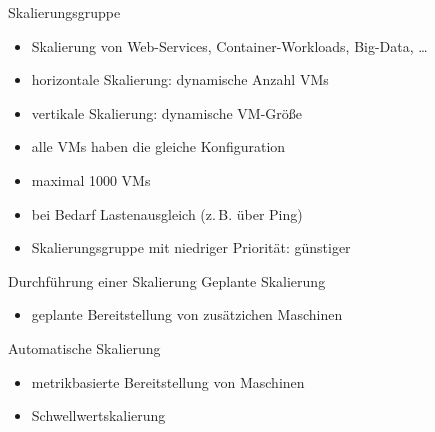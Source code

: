 

\begin{flashcard}[Definition]{Skalierungsgruppe}
    \begin{itemize}
        \item Skalierung von Web-Services, Container-Workloads, Big-Data, \ldots
        \item horizontale Skalierung: dynamische Anzahl VMs
        \item vertikale Skalierung: dynamische VM-Größe
        \item alle VMs haben die gleiche Konfiguration
        \item maximal 1000 VMs
        \item bei Bedarf Lastenausgleich (z.\,B. über Ping)
        \item Skalierungsgruppe mit niedriger Priorität: günstiger
    \end{itemize}
\end{flashcard}

\begin{flashcard}[Definition]{Durchführung einer Skalierung}
    Geplante Skalierung
    \begin{itemize}
        \item geplante Bereitstellung von zusätzichen Maschinen
    \end{itemize}
    \vspace{1cm}
    Automatische Skalierung
    \begin{itemize}
        \item metrikbasierte Bereitstellung von Maschinen
        \item Schwellwertskalierung
    \end{itemize}

\end{flashcard}

